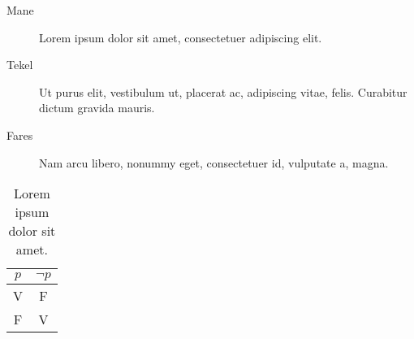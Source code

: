 \bigskip

\lipsum[2]

\begin{description}
\item[Mane] Lorem ipsum dolor sit amet, consectetuer adipiscing elit. 
\item[Tekel] Ut purus elit, vestibulum ut, placerat ac, adipiscing vitae, felis. Curabitur dictum gravida mauris.
\item[Fares] Nam arcu libero, nonummy eget, consectetuer 
id, vulputate a, magna.
\end{description}

\begin{table}
\caption[Lorem ipsum dolor.]{Lorem ipsum dolor sit amet.}
\centering
\begin{tabular}{cc}
\toprule
$p$ & $\lnot p$ \\ 
\midrule
V   & F \\ 
F   & V \\
\bottomrule 
\end{tabular}
\end{table}

\lipsum[1]




